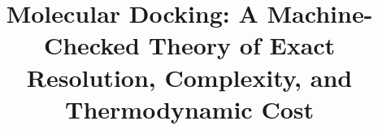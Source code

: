 \documentclass[11pt]{article}
\title{Molecular Docking: A Machine-Checked Theory of Exact Resolution, Complexity, and Thermodynamic Cost}
\begin{document}
\maketitle
\paperfooter


\begin{abstract}

\end{abstract}















\end{document}
